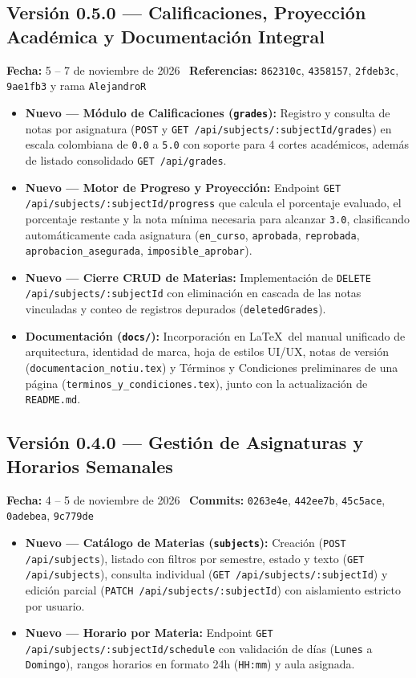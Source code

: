 \documentclass[11pt,letterpaper]{article}
\begin{document}
\subsection*{\textcolor{carmesiVivido}{Versión 0.5.0} --- Calificaciones, Proyección Académica y Documentación Integral}
\textbf{Fecha:} 5 -- 7 de noviembre de 2026 \textbar\ \textbf{Referencias:} \texttt{862310c}, \texttt{4358157}, \texttt{2fdeb3c}, \texttt{9ae1fb3} y rama \texttt{AlejandroR}
\begin{itemize}[leftmargin=1.5em, itemsep=2pt]
  \item \textbf{Nuevo --- Módulo de Calificaciones (\texttt{grades}):} Registro y consulta de notas por asignatura (\texttt{POST} y \texttt{GET /api/subjects/:subjectId/grades}) en escala colombiana de \texttt{0.0} a \texttt{5.0} con soporte para 4 cortes académicos, además de listado consolidado \texttt{GET /api/grades}.
  \item \textbf{Nuevo --- Motor de Progreso y Proyección:} Endpoint \texttt{GET /api/subjects/:subjectId/progress} que calcula el porcentaje evaluado, el porcentaje restante y la nota mínima necesaria para alcanzar \texttt{3.0}, clasificando automáticamente cada asignatura (\texttt{en\_curso}, \texttt{aprobada}, \texttt{reprobada}, \texttt{aprobacion\_asegurada}, \texttt{imposible\_aprobar}).
  \item \textbf{Nuevo --- Cierre CRUD de Materias:} Implementación de \texttt{DELETE /api/subjects/:subjectId} con eliminación en cascada de las notas vinculadas y conteo de registros depurados (\texttt{deletedGrades}).
  \item \textbf{Documentación (\texttt{docs/}):} Incorporación en \LaTeX\ del manual unificado de arquitectura, identidad de marca, hoja de estilos UI/UX, notas de versión (\texttt{documentacion\_notiu.tex}) y Términos y Condiciones preliminares de una página (\texttt{terminos\_y\_condiciones.tex}), junto con la actualización de \texttt{README.md}.
\end{itemize}

\subsection*{\textcolor{carmesiVivido}{Versión 0.4.0} --- Gestión de Asignaturas y Horarios Semanales}
\textbf{Fecha:} 4 -- 5 de noviembre de 2026 \textbar\ \textbf{Commits:} \texttt{0263e4e}, \texttt{442ee7b}, \texttt{45c5ace}, \texttt{0adebea}, \texttt{9c779de}
\begin{itemize}[leftmargin=1.5em, itemsep=2pt]
  \item \textbf{Nuevo --- Catálogo de Materias (\texttt{subjects}):} Creación (\texttt{POST /api/subjects}), listado con filtros por semestre, estado y texto (\texttt{GET /api/subjects}), consulta individual (\texttt{GET /api/subjects/:subjectId}) y edición parcial (\texttt{PATCH /api/subjects/:subjectId}) con aislamiento estricto por usuario.
  \item \textbf{Nuevo --- Horario por Materia:} Endpoint \texttt{GET /api/subjects/:subjectId/schedule} con validación de días (\texttt{Lunes} a \texttt{Domingo}), rangos horarios en formato 24h (\texttt{HH:mm}) y aula asignada.
\end{itemize}
\end{document}
